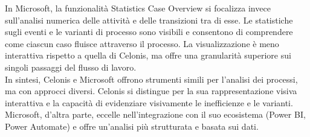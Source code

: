 \documentclass{article}
\begin{document}
In Microsoft, la funzionalità Statistics Case Overview si focalizza invece sull'analisi numerica delle attività e delle transizioni tra di esse. Le statistiche sugli eventi e le varianti di processo sono visibili e consentono di comprendere come ciascun caso fluisce attraverso il processo. La visualizzazione è meno interattiva rispetto a quella di Celonis, ma offre una granularità superiore sui singoli passaggi del flusso di lavoro.\\
In sintesi, Celonis e Microsoft offrono strumenti simili per l'analisi dei processi, ma con approcci diversi. Celonis si distingue per la sua rappresentazione visiva interattiva e la capacità di evidenziare visivamente le inefficienze e le varianti. Microsoft, d'altra parte, eccelle nell'integrazione con il suo ecosistema (Power BI, Power Automate) e offre un'analisi più strutturata e basata sui dati.
\end{document}
